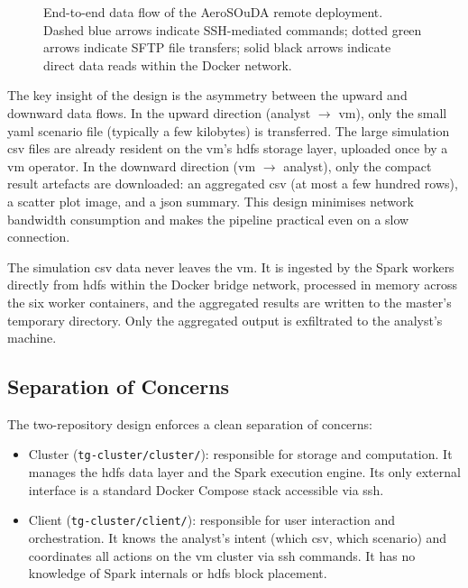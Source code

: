 \begin{figure}[htbp]
{\begin{tikzpicture}
\end{tikzpicture}%
}
\caption[End-to-end data flow of the AeroSOuDA remote deployment.]{End-to-end data flow of the AeroSOuDA remote deployment.
         Dashed blue arrows indicate SSH-mediated commands; dotted green arrows indicate
         SFTP file transfers; solid black arrows indicate direct data reads within
         the Docker network.}
\label{fig:rm-dataflow}
\end{figure}

The key insight of the design is the asymmetry between the upward and downward data flows.
In the upward direction (analyst $\to$ \gls{vm}), only the small \gls{yaml} scenario file
(typically a few kilobytes) is transferred.  The large simulation \gls{csv} files are already
resident on the \gls{vm}'s \gls{hdfs} storage layer, uploaded once by a \gls{vm} operator.
In the downward direction (\gls{vm} $\to$ analyst), only the compact result artefacts are
downloaded: an aggregated \gls{csv} (at most a few hundred rows), a scatter plot image, and a
\gls{json} summary.  This design minimises network bandwidth consumption and makes the pipeline
practical even on a slow connection.

The simulation \gls{csv} data never leaves the \gls{vm}.  It is ingested by the Spark workers
directly from \gls{hdfs} within the Docker bridge network, processed in memory across the six
worker containers, and the aggregated results are written to the master's temporary directory.
Only the aggregated output is exfiltrated to the analyst's machine.

\subsection{Separation of Concerns}
\label{subsec:rm-separation-of-concerns}

The two-repository design enforces a clean separation of concerns:

\begin{itemize}
  \item Cluster (\texttt{tg-cluster/cluster/}): responsible for storage and
        computation.  It manages the \gls{hdfs} data layer and the Spark execution engine.  Its
        only external interface is a standard Docker Compose stack accessible via \gls{ssh}.
  \item Client (\texttt{tg-cluster/client/}): responsible for user interaction
        and orchestration.  It knows the analyst's intent (which \gls{csv}, which scenario) and
        coordinates all actions on the \gls{vm} cluster via \gls{ssh} commands.  It has no
        knowledge of Spark internals or \gls{hdfs} block placement.
\end{itemize}


